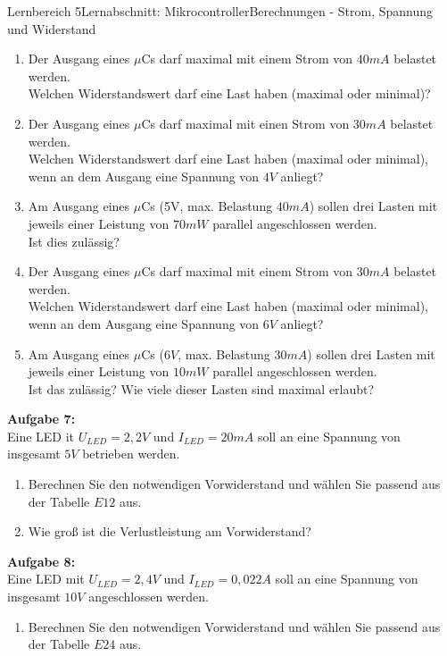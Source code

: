 \documentclass[oneside,openany,headings=optiontotoc,11pt,numbers=noenddot]{scrreprt}
\begin{document}
\begin{worksheet}{Lernbereich 5}{Lernabschnitt: Mikrocontroller}{Berechnungen - Strom, Spannung und Widerstand}
\begin{framed}
				\begin{enumerate}[label=(\alph*)]
					\item Der Ausgang eines \(\mu\)Cs darf maximal mit einem Strom von \(40mA\) belastet werden.\\
					Welchen Widerstandswert darf eine Last haben (maximal oder minimal)?
					\item Der Ausgang eines \(\mu\)Cs darf maximal mit einen Strom von \(30mA\) belastet werden.\\
					Welchen Widerstandswert darf eine Last haben (maximal oder minimal), wenn an dem Ausgang eine Spannung von \(4V\) anliegt?
					\item Am Ausgang eines \(\mu\)Cs (5V, max. Belastung \(40mA\)) sollen drei Lasten mit jeweils einer Leistung von \(70mW\) parallel angeschlossen werden.\\
					Ist dies zulässig?
					\item Der Ausgang eines \(\mu\)Cs darf maximal mit einem Strom von \(30mA\) belastet werden.\\
					Welchen Widerstandswert darf eine Last haben (maximal oder minimal), wenn an dem Ausgang eine Spannung von \(6V\) anliegt?
					\item Am Ausgang eines \(\mu\)Cs (\(6V\), max. Belastung \(30mA\)) sollen drei Lasten mit jeweils einer Leistung von \(10mW\) parallel angeschlossen werden.\\
					Ist das zulässig? Wie viele dieser Lasten sind maximal erlaubt?
				\end{enumerate}
				\par\noindent
				\textbf{Aufgabe 7:}\\
				Eine LED it \(U_{LED} = 2,2V\) und \(I_{LED} =  20mA\) soll an eine Spannung von insgesamt \(5V\) betrieben werden.
				\begin{enumerate}[label=(\alph*)]
					\item Berechnen Sie den notwendigen Vorwiderstand und wählen Sie passend aus der Tabelle \(E12\) aus.
					\item Wie groß ist die Verlustleistung am Vorwiderstand?
				\end{enumerate}
				\par\noindent
				\textbf{Aufgabe 8:}\\
				Eine LED mit \(U_{LED} = 2,4V\) und \(I_{LED} = 0,022A\) soll an eine Spannung von insgesamt \(10V\) angeschlossen werden.
				\begin{enumerate}[label=(\alph*)]
					\item Berechnen Sie den notwendigen Vorwiderstand und wählen Sie passend aus der Tabelle \(E24\) aus.

\end{enumerate}
\end{framed}
\end{worksheet}
\end{document}

